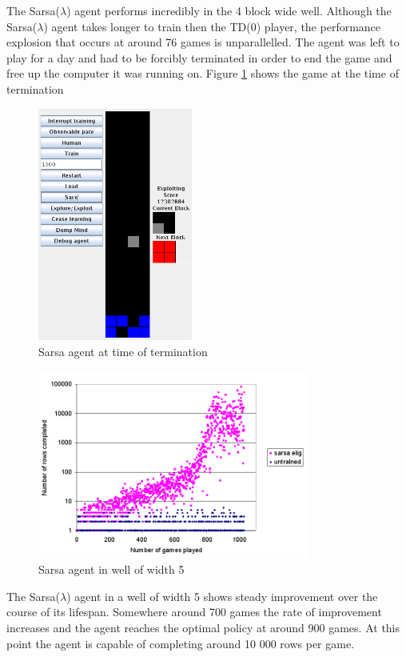 \documentclass{rucsthesis}
\begin{document}
The Sarsa($\lambda$) agent performs incredibly in the 4 block wide well. Although the Sarsa($\lambda$) agent takes longer to train then the TD(0) player, the performance explosion that occurs at around 76 games is unparallelled. The agent was left to play for a day and had to be forcibly terminated in order to end the game and free up the computer it was running on. Figure \ref{fig:sarsaelig4term} shows the game at the time of termination 

\begin{figure}[h]
\centering
\includegraphics[width=2in]{sarsaelig4term.png}
\caption{Sarsa agent at time of termination}
\label{fig:sarsaelig4term}
\end{figure}

\begin{figure}[h]
\centering
\includegraphics[width=3.5in]{sarsaeligredtet5well.png}
\caption{Sarsa agent in well of width 5}
\label{fig:sarsaeligredtet5well}
\end{figure}

The Sarsa($\lambda$) agent in a well of width 5 shows steady improvement over the course of its lifespan. Somewhere around 700 games the rate of improvement increases and the agent reaches the optimal policy at around 900 games. At this point the agent is capable of completing around 10 000 rows per game.
\end{document}
